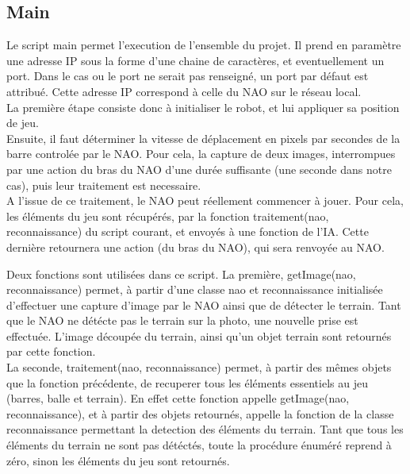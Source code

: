 \subsection{Main}
\label{sub:Main}

  \par Le script main permet l'execution de l'ensemble du projet.
  Il prend en paramètre une adresse IP sous la forme d'une chaine de caractères, et eventuellement un port.
  Dans le cas ou le port ne serait pas renseigné, un port par défaut est attribué.
  Cette adresse IP correspond à celle du NAO sur le réseau local.\\
  La première étape consiste donc à initialiser le robot, et lui appliquer sa position de jeu.\\
  Ensuite, il faut déterminer la vitesse de déplacement en pixels par secondes de la barre controlée par le NAO.
  Pour cela, la capture de deux images, interrompues par une action du bras du NAO d'une durée suffisante (une seconde dans notre cas), puis leur traitement est necessaire. \\
  A l'issue de ce traitement, le NAO peut réellement commencer à jouer.
  Pour cela, les éléments du jeu sont récupérés, par la fonction traitement(nao, reconnaissance) du script courant, et envoyés à une fonction de l'IA.
  Cette dernière retournera une action (du bras du NAO), qui sera renvoyée au NAO.

  \par Deux fonctions sont utilisées dans ce script.
  La première, getImage(nao, reconnaissance) permet, à partir d'une classe nao et reconnaissance initialisée d'effectuer une capture d'image par le NAO ainsi que de détecter le terrain.
  Tant que le NAO ne détécte pas le terrain sur la photo, une nouvelle prise est effectuée.
  L'image découpée du terrain, ainsi qu'un objet terrain sont retournés par cette fonction.\\
  La seconde, traitement(nao, reconnaissance) permet, à partir des mêmes objets que la fonction précédente, de recuperer tous les éléments essentiels au jeu (barres, balle et terrain).
  En effet cette fonction appelle getImage(nao, reconnaissance), et à partir des objets retournés, appelle la fonction de la classe reconnaissance permettant la detection des éléments du terrain.
  Tant que tous les éléments du terrain ne sont pas détéctés, toute la procédure énuméré reprend à zéro, sinon les éléments du jeu sont retournés.
